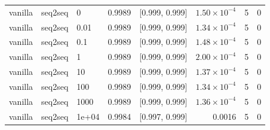 \documentclass[10pt]{article}
\begin{document}
{\begin{longtable}{lllrlrrr}
vanilla & seq2seq & 0 & 0.9989 & [0.999, 0.999] & $1.50\times10^{-4}$ & 5 & 0\\
vanilla & seq2seq & 0.01 & 0.9989 & [0.999, 0.999] & $1.34\times10^{-4}$ & 5 & 0\\
vanilla & seq2seq & 0.1 & 0.9989 & [0.999, 0.999] & $1.48\times10^{-4}$ & 5 & 0\\
vanilla & seq2seq & 1 & 0.9989 & [0.999, 0.999] & $2.00\times10^{-4}$ & 5 & 0\\
vanilla & seq2seq & 10 & 0.9989 & [0.999, 0.999] & $1.37\times10^{-4}$ & 5 & 0\\
vanilla & seq2seq & 100 & 0.9989 & [0.999, 0.999] & $1.34\times10^{-4}$ & 5 & 0\\
vanilla & seq2seq & 1000 & 0.9989 & [0.999, 0.999] & $1.36\times10^{-4}$ & 5 & 0\\
vanilla & seq2seq & 1e+04 & 0.9984 & [0.997, 0.999] & 0.0016 & 5 & 0\\
\bottomrule
\end{longtable}
}
\end{document}
